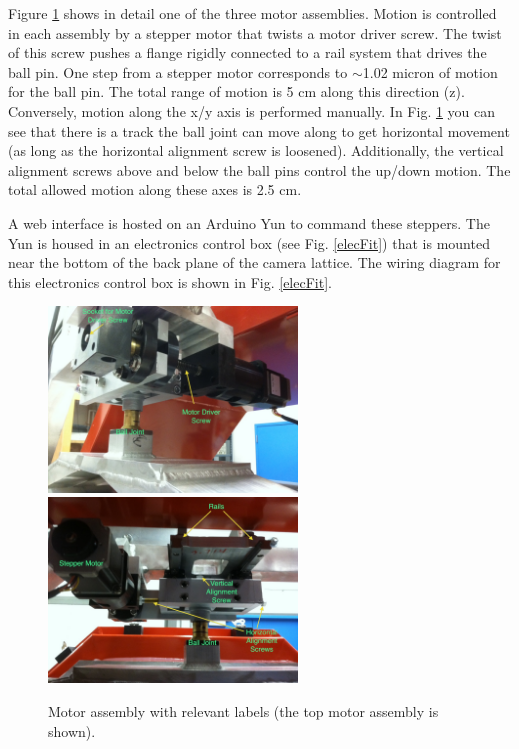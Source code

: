 \documentclass[11pt]{article}
\begin{document}
Figure \ref{FigMotor} shows in detail one of the three motor assemblies.
Motion is controlled in each assembly by a stepper motor that twists a motor driver screw.
The twist of this screw pushes a flange rigidly connected to a rail system that drives the ball pin.
One step from a stepper motor corresponds to $\sim$1.02 micron of motion for the ball pin.
The total range of motion is 5 cm along this direction (z).
Conversely, motion along the x/y axis is performed manually.
In Fig. \ref{FigMotor} you can see that there is a track the ball joint can move along to get horizontal movement (as long as the horizontal alignment screw is loosened).
Additionally, the vertical alignment screws above and below the ball pins control the up/down motion.
The total allowed motion along these axes is 2.5 cm.

A web interface is hosted on an Arduino Yun to command these steppers.
The Yun is housed in an electronics control box (see Fig. \ref{elecFit}) that is mounted near the bottom of the back plane of the camera lattice.
The wiring diagram for this electronics control box is shown in Fig. \ref{elecFit}.

\begin{figure}[h]
\begin{center}
\includegraphics[width = 2.6in]{motorAss1Edit.JPG}
\includegraphics[width = 2.6in]{motorAss2Edit.JPG}
\caption{Motor assembly with relevant labels (the top motor assembly is shown).}  
\label{FigMotor}
\end{center}
\end{figure}
\end{document}
